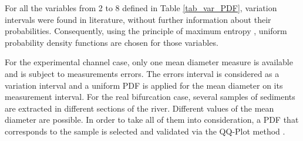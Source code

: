 For all the variables from 2 to 8 defined in Table \ref{tab_var_PDF}, variation intervals were found in literature, without further information about their probabilities. Consequently, using the principle of maximum entropy \cite{bib19}, uniform probability density functions are chosen for those variables. 

For the experimental channel case, only one mean diameter measure is available and is subject to measurements errors. The errors interval is considered as a variation interval and a uniform PDF is applied for the mean diameter on its measurement interval. For the real bifurcation case, several samples of sediments are extracted in different sections of the river. Different values of the mean diameter are possible. In order to take all of them into consideration, a PDF that corresponds to the sample is selected and validated via the QQ-Plot method \cite{bib11}.

